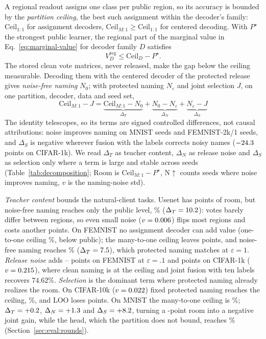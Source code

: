A regional readout assigns one class per public region, so its accuracy is
bounded by the \emph{partition ceiling}, the best such assignment within the
decoder's family: $\mathrm{Ceil}_{1:1}$ for
assignment decoders, $\mathrm{Ceil}_{M:1}\ge\mathrm{Ceil}_{1:1}$ for centered
decoding. With $P^\star$ the strongest public learner, the regional part of
the marginal value in Eq.~\eqref{eq:marginal-value} for decoder family $D$
satisfies
\begin{equation}
V^{\mathrm{reg}}_D\le\mathrm{Ceil}_D-P^\star .
\label{eq:ceiling}
\end{equation}
The stored clean vote matrices, never released, make the gap below the
ceiling measurable. Decoding them with the centered decoder of the protected
release gives \emph{noise-free naming} $N_0$; with protected naming
$N_\varepsilon$ and joint selection $J$, on one partition, decoder, data and
seed set,
\begin{equation}
\mathrm{Ceil}_{M:1}-J=\underbrace{\mathrm{Ceil}_{M:1}-N_0}_{\Delta_T}
+\underbrace{N_0-N_\varepsilon}_{\Delta_N}
+\underbrace{N_\varepsilon-J}_{\Delta_S}
\label{eq:decomposition}
\end{equation}
The identity telescopes, so its terms are signed controlled differences, not
causal attributions: noise improves naming on \NoiseImprMnist{} MNIST seeds
and \NoiseImprFemnist{} FEMNIST-2k/1 seeds, and $\Delta_S$ is negative
wherever fusion with the labels corrects noisy names ($-24.3$ points
on CIFAR-1k). We read $\Delta_T$ as teacher content, $\Delta_N$ as release
noise and $\Delta_S$ as selection only where a term is large and stable
across seeds (Table~\ref{tab:decomposition};
Room is $\mathrm{Ceil}_{M:1}-P^\star$, N$\uparrow$ counts seeds where noise
improves naming, $v$ is the naming-noise std).

\emph{Teacher content} bounds the natural-client tasks. Usenet has
\RoomUsenetMany{} points of room, but noise-free naming reaches only the
public level, \CleanUsenet{}\% ($\Delta_T=10.2$): votes barely
differ between regions, so even small noise ($v=0.006$) flips
most regions and costs another \NoiseLossUsenet{} points. On FEMNIST no
assignment decoder can add value (one-to-one ceiling \CeilFemnistOne{}\%,
below public); the many-to-one ceiling leaves \RoomFemnistMany{} points, and
noise-free naming reaches \CleanFemnist{}\% ($\Delta_T=7.5$),
which protected naming matches at $\varepsilon=1$. \emph{Release noise} adds
\NoiseLossFemnistTenth{}--\NoiseLossFemnistOneTenth{} points on FEMNIST at
$\varepsilon=.1$ and \NoiseLossCifarOne{} points on CIFAR-1k
($v=0.215$), where clean naming is at the ceiling and joint fusion
with ten labels recovers $74.62\%$. \emph{Selection} is the dominant term where
protected naming already realizes the room. On CIFAR-10k ($v=0.022$)
fixed protected naming reaches the ceiling, \NamedCifarTen{}\%, and LOO
loses \SelLossCifarTen{} points. On MNIST the many-to-one ceiling is
\CeilMnistMany{}\%; $\Delta_T=+0.2$, $\Delta_N=+1.3$ and
$\Delta_S=+8.2$, turning a \RoomMnistMany{}-point room into a negative
joint gain, while the head, which the partition does not bound, reaches
\HeadMnist{}\% (Section~\ref{sec:eval:rounds}).

